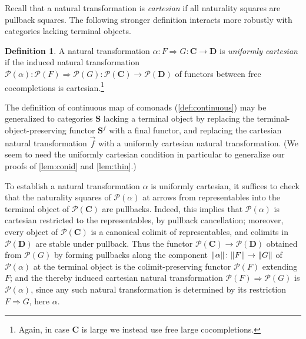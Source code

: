 \documentclass[11pt, oneside, article]{memoir}
\theoremstyle{plain}
\theoremstyle{definition}
\newtheorem{definition}[def]{Definition}
\theoremstyle{remark}
\DeclarePairedDelimiter{\gen}{\langle}{\rangle}
\DeclarePairedDelimiter{\norm}{\lVert}{\rVert}
\newcommand{\cat}[1]{\mathbf{#1}}
\newcommand{\CoalgOn}[2]{{#2}^{#1}}
\newcommand{\CoalgS}[1]{\CoalgOn{#1}{\bS}}
\newcommand{\fpts}[1]{{\norm{#1}}}
\newcommand{\lift}[1]{\widecheck{#1}}
\newcommand{\ph}[1]{#1}
\newcommand{\con}[2]{{#1}^{#2}}
\newcommand{\connat}[1]{\vec{#1}}
\newcommand{\Coco}[1]{\mathcal{P}(#1)}
\newcommand{\xX}{X}
\newcommand{\bC}{\cat{C}}
\newcommand{\bD}{\cat{D}}
\newcommand{\bS}{\cat{S}}
\newcommand{\pP}{\ph{P}}
\newcommand{\cP}{\gen{\pP}}
\newcommand{\lP}{\lift{\pP}}
\newcommand{\PS}{\CoalgS{\cP}}
\newcommand{\anoteNI}[1]{}
\begin{document}

Recall that a natural transformation is \emph{cartesian} if all
naturality squares are pullback squares. The following stronger
definition interacts more robustly with categories lacking terminal
objects.

\begin{definition}\label{def:cartesian}
  A natural transformation
  $\alpha \colon F \Rightarrow G \colon \bC \to \bD$ is
  \emph{uniformly cartesian} if the induced natural transformation
  $\Coco{\alpha} \colon \Coco{F} \Rightarrow \Coco{G} \colon
  \Coco{\bC} \to \Coco{\bD}$ of functors between free cocompletions is
  cartesian.\footnote{Again, in case $\bC$ is large we instead use
    free large cocompletions.}
\end{definition}

The definition of continuous map of comonads (\cref{def:continuous})
may be generalized to categories $\bS$ lacking a terminal object by
replacing the terminal-object-preserving functor $\con{\bS}{f}$ with a
final functor, and replacing the cartesian natural transformation
$\connat{f}$ with a uniformly cartesian natural transformation. (We
seem to need the uniformly cartesian condition in particular to
generalize our proofs of \cref{lem:conid} and
\cref{lem:thin}.\anoteNI{Are there counterexamples without this
  assumption?})

To establish a natural transformation $\alpha$ is uniformly cartesian,
it suffices to check that the naturality squares of $\Coco{\alpha}$ at
arrows from representables into the terminal object of $\Coco{\bC}$
are pullbacks. Indeed, this implies that $\Coco{\alpha}$ is cartesian
restricted to the representables, by pullback cancellation; moreover,
every object of $\Coco{\bC}$ is a canonical colimit of representables,
and colimits in $\Coco{\bD}$ are stable under pullback. Thus the
functor $\Coco{\bC} \to \Coco{\bD}$ obtained from $\Coco{G}$ by
forming pullbacks along the component
$\fpts{\alpha} \colon \fpts{F} \to \fpts{G}$ of $\Coco{\alpha}$ at the
terminal object is the colimit-preserving functor $\Coco{F}$ extending
$F$; and the thereby induced cartesian natural transformation
$\Coco{F} \Rightarrow \Coco{G}$ is $\Coco{\alpha}$, since any such
natural transformation is determined by its restriction
$F \Rightarrow G$, here $\alpha$.
\end{document}
